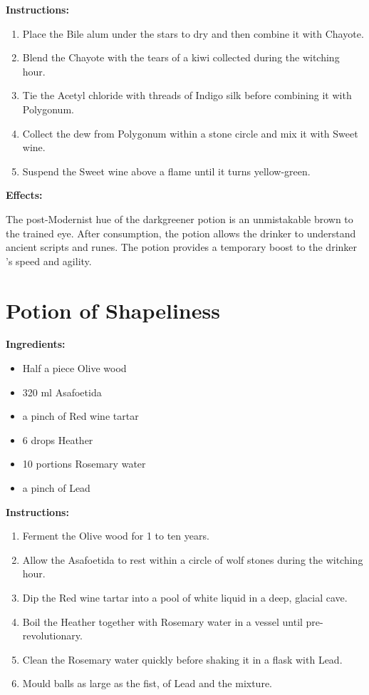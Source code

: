 \documentclass{article}
\begin{document}
\textbf{Instructions:}

\begin{enumerate}
  \item Place the Bile alum under the stars to dry and then combine it with Chayote.
  \item Blend the Chayote with the tears of a kiwi collected during the witching hour.
  \item Tie the Acetyl chloride with threads of Indigo silk before combining it with Polygonum.
  \item Collect the dew from Polygonum within a stone circle and mix it with Sweet wine.
  \item Suspend the Sweet wine above a flame until it turns yellow-green.
\end{enumerate}

\textbf{Effects:}

The post-Modernist hue of the darkgreener potion is an unmistakable brown to the trained eye. After consumption, the potion allows the drinker to understand ancient scripts and runes. The potion provides a temporary boost to the drinker 's speed and agility.

\newpage
\section*{Potion of Shapeliness}

\textbf{Ingredients:}

\begin{itemize}
  \item Half a piece Olive wood
  \item 320 ml Asafoetida
  \item a pinch of Red wine tartar
  \item 6 drops Heather
  \item 10 portions Rosemary water
  \item a pinch of Lead
\end{itemize}

\textbf{Instructions:}

\begin{enumerate}
  \item Ferment the Olive wood for 1 to ten years.
  \item Allow the Asafoetida to rest within a circle of wolf stones during the witching hour.
  \item Dip the Red wine tartar into a pool of white liquid in a deep, glacial cave.
  \item Boil the Heather together with Rosemary water in a vessel until pre-revolutionary.
  \item Clean the Rosemary water quickly before shaking it in a flask with Lead.
  \item Mould balls as large as the fist, of Lead and the mixture.
\end{enumerate}
\end{document}

